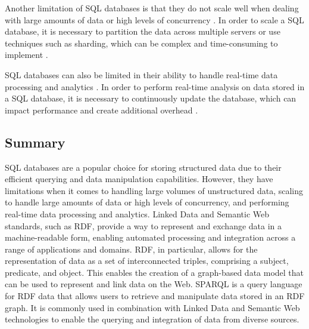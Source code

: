 Another limitation of SQL databases is that they do not scale well when dealing with large amounts of data or high levels of concurrency \citep{kleppmann2019designing,chen2014data}.  In order to scale a SQL database, it is necessary to partition the data across multiple servers or use techniques such as sharding, which can be complex and time-consuming to implement \citep{ramez2016fundamentals}.

SQL databases can also be limited in their ability to handle real-time data processing and analytics \citep{kleppmann2019designing,chen2014data}.  In order to perform real-time analysis on data stored in a SQL database, it is necessary to continuously update the database, which can impact performance and create additional overhead \citep{garcia2008database}.

\subsection{Summary}

SQL databases are a popular choice for storing structured data due to their efficient querying and data manipulation capabilities.  However, they have limitations when it comes to handling large volumes of unstructured data, scaling to handle large amounts of data or high levels of concurrency, and performing real-time data processing and analytics.  Linked Data and Semantic Web standards, such as RDF, provide a way to represent and exchange data in a machine-readable form, enabling automated processing and integration across a range of applications and domains.  RDF, in particular, allows for the representation of data as a set of interconnected triples, comprising a subject, predicate, and object.  This enables the creation of a graph-based data model that can be used to represent and link data on the Web.  SPARQL is a query language for RDF data that allows users to retrieve and manipulate data stored in an RDF graph.  It is commonly used in combination with Linked Data and Semantic Web technologies to enable the querying and integration of data from diverse sources.
